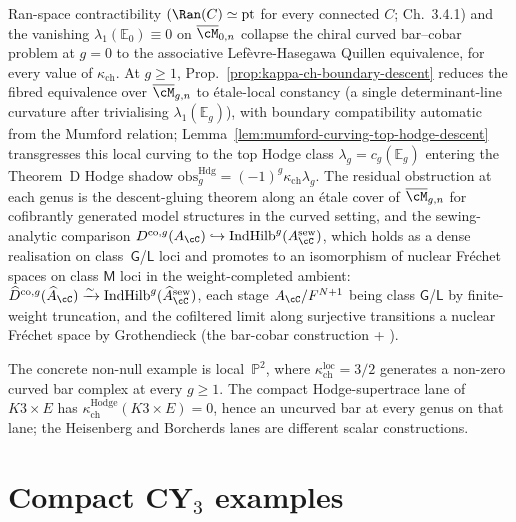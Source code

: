 Ran-space contractibility $(\Ran(C)\simeq\mathrm{pt}$ for every connected $C$;
\cite{BeilinsonDrinfeld} Ch.~3.4.1) and the vanishing $\lambda_1(\mathbb{E}_0)\equiv 0$
on $\overline{\cM}_{0,n}$ collapse the chiral curved bar--cobar problem at
$g=0$ to the associative Lef\`evre-Hasegawa Quillen equivalence, for every
value of $\kappa_{\mathrm{ch}}$. At $g\geq 1$, Prop.~\ref{prop:kappa-ch-boundary-descent}
reduces the fibred equivalence over $\overline{\cM}_{g,n}$ to \'etale-local
constancy (a single determinant-line curvature after trivialising
$\lambda_1(\mathbb{E}_g)$), with boundary compatibility automatic from
the Mumford relation; Lemma~\ref{lem:mumford-curving-top-hodge-descent}
transgresses this local curving to the top Hodge class
$\lambda_g=c_g(\mathbb{E}_g)$ entering the Theorem~D Hodge shadow
$\mathrm{obs}^{\mathrm{Hdg}}_g=(-1)^g\kappa_{\mathrm{ch}}\lambda_g$. The residual
obstruction at each genus is the descent-gluing theorem along an \'etale
cover of $\overline{\cM}_{g,n}$ for cofibrantly generated model structures
in the curved setting, and the sewing-analytic comparison
$D^{\mathrm{co},g}(A_\cC)\hookrightarrow\mathrm{IndHilb}^g(A_\cC^{\mathrm{sew}})$,
which holds as a dense realisation on class~$\mathsf{G}$/$\mathsf{L}$ loci
and promotes to an isomorphism of nuclear Fr\'echet spaces on class
$\mathsf{M}$ loci in the weight-completed ambient:
$\widehat{D}^{\mathrm{co},g}(\widehat{A}_\cC)\xrightarrow{\sim}
\mathrm{IndHilb}^g(\widehat{A}_\cC^{\mathrm{sew}})$, each stage
$A_\cC/F^{N+1}$ being class $\mathsf{G}$/$\mathsf{L}$ by finite-weight
truncation, and the cofiltered limit along surjective transitions a
nuclear Fr\'echet space by Grothendieck (the bar-cobar construction
\cite{VolI} +
\cite{VolI}).

The concrete non-null example is local~$\mathbb{P}^2$, where
$\kappa_{\mathrm{ch}}^{\mathrm{loc}} = 3/2$ generates a non-zero curved bar complex at every
$g\geq 1$. The compact Hodge-supertrace lane of $K3\times E$ has
$\kappa_{\mathrm{ch}}^{\mathrm{Hodge}}(K3\times E) = 0$, hence an uncurved bar at every genus on that lane; the Heisenberg and Borcherds lanes are different scalar constructions.



\section{Compact CY\texorpdfstring{$_3$}{-3} examples}
\label{sec:compact-cy3-examples}

